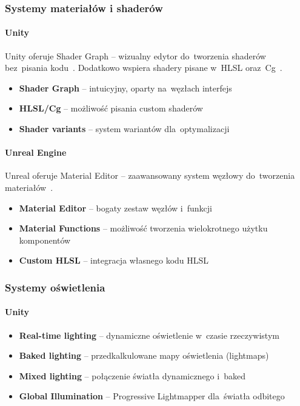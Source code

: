 \subsubsection{Systemy materiałów i shaderów}

\paragraph{Unity}
Unity oferuje Shader Graph -- wizualny edytor do~tworzenia shaderów bez~pisania kodu~\cite{unity_shader_graph}. Dodatkowo wspiera shadery pisane w~HLSL oraz~Cg~\cite{farina2013shader}.

\begin{itemize}
    \item \textbf{Shader Graph} -- intuicyjny, oparty na~węzłach interfejs~\cite{unity_shader_graph}
    \item \textbf{HLSL/Cg} -- możliwość pisania custom shaderów~\cite{farina2013shader}
    \item \textbf{Shader variants} -- system wariantów dla~optymalizacji~\cite{unity_shader_graph}
\end{itemize}

\paragraph{Unreal Engine}
Unreal oferuje Material Editor -- zaawansowany system węzłowy do~tworzenia materiałów~\cite{unreal_material_editor}.

\begin{itemize}
    \item \textbf{Material Editor} -- bogaty zestaw węzłów i~funkcji~\cite{unreal_material_editor}
    \item \textbf{Material Functions} -- możliwość tworzenia wielokrotnego użytku komponentów~\cite{unreal_material_editor}
    \item \textbf{Custom HLSL} -- integracja własnego kodu HLSL~\cite{farina2013shader}
\end{itemize}

\subsubsection{Systemy oświetlenia}

\paragraph{Unity}
\begin{itemize}
    \item \textbf{Real-time lighting} -- dynamiczne oświetlenie w~czasie rzeczywistym~\cite{unity_hdrp_docs}
    \item \textbf{Baked lighting} -- przedkalkulowane mapy oświetlenia (lightmaps)~\cite{unity_urp_docs}
    \item \textbf{Mixed lighting} -- połączenie światła dynamicznego i~baked~\cite{unity_hdrp_docs}
    \item \textbf{Global Illumination} -- Progressive Lightmapper dla~światła odbitego~\cite{gregory2018game}
\end{itemize}

